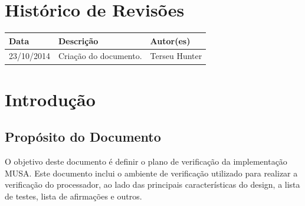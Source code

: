 \documentclass{article}
\begin{document}
\capa

  \section*{\center Histórico de Revisões}
  \vspace*{1cm}
  \begin{center} %
    \begin{longtable}[pos]{|m{2cm} | m{7.2cm} | m{3.8cm}|} 
      \hline %
      \cellcolor[gray]{0.9}
      \textbf{Data} & \cellcolor[gray]{0.9}\textbf{Descrição} & \cellcolor[gray]{0.9}\textbf{Autor(es)}\\ \hline
      \hline
      \small 23/10/2014 & \small Criação do documento. & \small Terseu Hunter \\ \hline 
    \end{longtable}
  \end{center}

  \newpage
  \tableofcontents
  \newpage

  \section{Introdução}

	\subsection{Propósito do Documento}
	O objetivo deste documento é definir o plano de verificação da implementação MUSA. Este documento inclui o ambiente de verificação utilizado para realizar a verificação do processador, ao lado das principais características do design, a lista de testes, lista de afirmações e outros.
	
\end{document}
